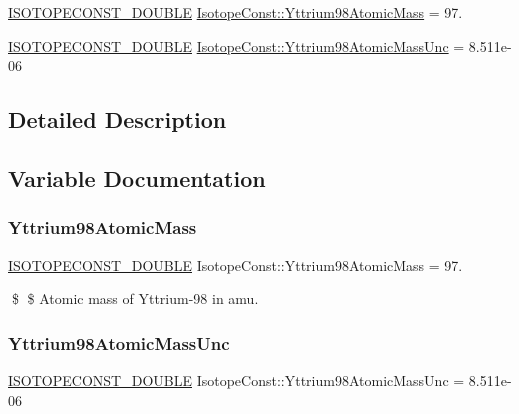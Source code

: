 \begin{DoxyCompactItemize}
\item 
\mbox{\hyperlink{group___isotope_const-_macros_ga8f45a7272ce02c0b4c65c44636ed719a}{I\+S\+O\+T\+O\+P\+E\+C\+O\+N\+S\+T\+\_\+\+D\+O\+U\+B\+LE}} \mbox{\hyperlink{group___isotope_const-_yttrium-_y98_ga7bb1aa571cad777be755334d6f132e94}{Isotope\+Const\+::\+Yttrium98\+Atomic\+Mass}} = 97.
\item 
\mbox{\hyperlink{group___isotope_const-_macros_ga8f45a7272ce02c0b4c65c44636ed719a}{I\+S\+O\+T\+O\+P\+E\+C\+O\+N\+S\+T\+\_\+\+D\+O\+U\+B\+LE}} \mbox{\hyperlink{group___isotope_const-_yttrium-_y98_ga5612515681e4c22635c9b3f050e1224c}{Isotope\+Const\+::\+Yttrium98\+Atomic\+Mass\+Unc}} = 8.\+511e-\/06
\end{DoxyCompactItemize}


\subsection{Detailed Description}


\subsection{Variable Documentation}
\mbox{\label{group___isotope_const-_yttrium-_y98_ga7bb1aa571cad777be755334d6f132e94}} 
\subsubsection{\texorpdfstring{Yttrium98\+Atomic\+Mass}{Yttrium98AtomicMass}}
{\footnotesize\ttfamily \mbox{\hyperlink{group___isotope_const-_macros_ga8f45a7272ce02c0b4c65c44636ed719a}{I\+S\+O\+T\+O\+P\+E\+C\+O\+N\+S\+T\+\_\+\+D\+O\+U\+B\+LE}} Isotope\+Const\+::\+Yttrium98\+Atomic\+Mass = 97.}

\$ \$ Atomic mass of Yttrium-\/98 in amu. \mbox{\label{group___isotope_const-_yttrium-_y98_ga5612515681e4c22635c9b3f050e1224c}} 
\subsubsection{\texorpdfstring{Yttrium98\+Atomic\+Mass\+Unc}{Yttrium98AtomicMassUnc}}
{\footnotesize\ttfamily \mbox{\hyperlink{group___isotope_const-_macros_ga8f45a7272ce02c0b4c65c44636ed719a}{I\+S\+O\+T\+O\+P\+E\+C\+O\+N\+S\+T\+\_\+\+D\+O\+U\+B\+LE}} Isotope\+Const\+::\+Yttrium98\+Atomic\+Mass\+Unc = 8.\+511e-\/06}

